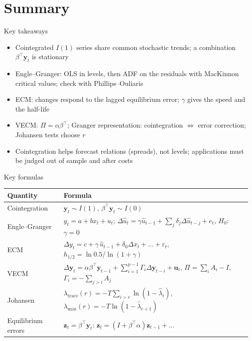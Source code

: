 \section{Summary}

\begin{frame}{Key takeaways}
\itemsize{\small}
\begin{itemize}
    \item Cointegrated $I(1)$ series share common stochastic trends; a combination $\beta^\top\mathbf y_t$ is stationary
    \item Engle--Granger: OLS in levels, then ADF on the residuals with MacKinnon critical values; check with Phillips--Ouliaris
    \item ECM: changes respond to the lagged equilibrium error; $\gamma$ gives the speed and the half-life
    \item VECM: $\Pi = \alpha\beta^\top$; Granger representation: cointegration $\Leftrightarrow$ error correction; Johansen tests choose $r$
    \item Cointegration helps forecast relations (spreads), not levels; applications must be judged out of sample and after costs
\end{itemize}
\end{frame}

\begin{frame}{Key formulas}
\itemsize{\small}
{\renewcommand{\arraystretch}{1.4}\begin{center}
\footnotesize
\begin{tabular}{ll}
\toprule
\textbf{Quantity} & \textbf{Formula} \\
\midrule
Cointegration & $\mathbf y_t \sim I(1)$, \quad $\beta^\top\mathbf y_t \sim I(0)$ \\
Engle--Granger & $y_t = a + b x_t + u_t$; \quad $\Delta\hat u_t = \gamma\hat u_{t-1} + \sum_j\delta_j\Delta\hat u_{t-j} + e_t$, \quad $H_0$: $\gamma = 0$ \\
ECM & $\Delta y_t = c + \gamma\,\hat u_{t-1} + \delta_0\Delta x_t + \dots + \varepsilon_t$, \quad $h_{1/2} = \ln 0.5/\ln(1 + \gamma)$ \\
VECM & $\Delta\mathbf y_t = \alpha\beta^\top\mathbf y_{t-1} + \sum_{i=1}^{p-1}\Gamma_i\Delta\mathbf y_{t-i} + \mathbf u_t$, \quad $\Pi = \sum_i A_i - I$, \quad $\Gamma_i = -\sum_{j>i}A_j$ \\
Johansen & $\lambda_{\mathrm{trace}}(r) = -T\sum_{i>r}\ln(1 - \hat\lambda_i)$, \quad $\lambda_{\max}(r) = -T\ln(1 - \hat\lambda_{r+1})$ \\
Equilibrium errors & $\mathbf z_t = \beta^\top\mathbf y_t$: \quad $\mathbf z_t = (I + \beta^\top\alpha)\mathbf z_{t-1} + \dots$ \\
\bottomrule
\end{tabular}
\end{center}
}
\end{frame}

